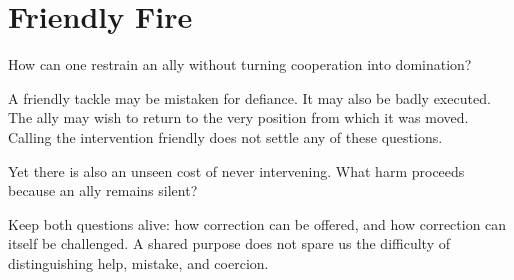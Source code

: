 \chapter{Friendly Fire}
\label{short:friendly-fire}

How can one restrain an ally without turning cooperation into domination?

A friendly tackle may be mistaken for defiance. It may also be badly
executed. The ally may wish to return to the very position from which it was
moved. Calling the intervention friendly does not settle any of these
questions.

Yet there is also an unseen cost of never intervening. What harm proceeds
because an ally remains silent?

Keep both questions alive: how correction can be offered, and how correction
can itself be challenged. A shared purpose does not spare us the difficulty
of distinguishing help, mistake, and coercion.

